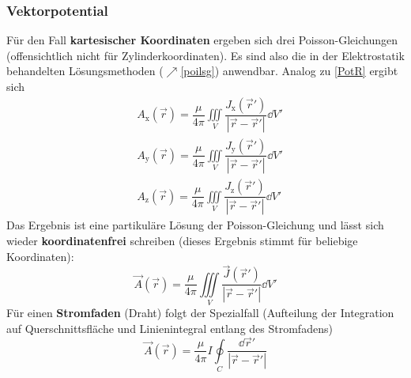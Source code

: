   \subsubsection{Vektorpotential}
		  Für den Fall \textbf{kartesischer Koordinaten} ergeben sich drei Poisson-Gleichungen (offensichtlich nicht für Zylinderkoordinaten). Es sind also die in der Elektrostatik behandelten Lösungsmethoden ($\nearrow$\ref{poilsg}) anwendbar.  Analog zu \ref{PotR} ergibt sich
		        \begin{equation}\begin{split}
				        &  A _\mathrm{x}(\vec{r} ) = \dfrac{\mu}{4 \pi} \iiint\limits_{V} \dfrac{J_\mathrm{x}(\vec{r}' ) }{\left| \vec{r}  - \vec{r}'  \right|} \dd V' \\
				        &  A _\mathrm{y}(\vec{r} ) = \dfrac{\mu}{4 \pi} \iiint\limits_{V} \dfrac{J_\mathrm{y}(\vec{r}' ) }{\left| \vec{r}  - \vec{r}'  \right|} \dd V' \\
				        &  A _\mathrm{z}(\vec{r} ) = \dfrac{\mu}{4 \pi} \iiint\limits_{V} \dfrac{J_\mathrm{z}(\vec{r}' ) }{\left| \vec{r}  - \vec{r}'  \right|} \dd V'
			        \end{split}\end{equation}
		         Das Ergebnis ist eine partikuläre Lösung der Poisson-Gleichung und lässt sich wieder \textbf{koordinatenfrei} schreiben (dieses Ergebnis stimmt für beliebige Koordinaten):
		        \begin{equation} \label{Akoordfrei}
			        \boxed{ \vec{A}(\vec{r} ) = \dfrac{\mu}{4 \pi} \iiint\limits_{V} \dfrac{\vec{J}(\vec{r}' )}{\left| \vec{r}  - \vec{r}'  \right|} \dd V'}
		        \end{equation}
		  Für einen \textbf{Stromfaden} (Draht) folgt der Spezialfall (Aufteilung der Integration auf Querschnittsfläche und Linienintegral entlang des Stromfadens)
		        \begin{equation}\label{Astromfad}
			       \boxed{ \vec{A}(\vec{r} ) = \dfrac{\mu}{4  \pi}   I  \oint\limits_{C} \dfrac{\dd \vec{r}'}{\left| \vec{r}  - \vec{r}'  \right|}}
		        \end{equation}
